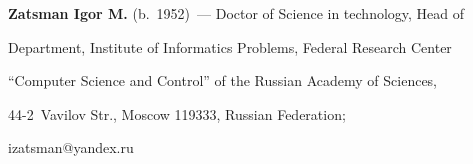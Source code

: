 \noindent


\textbf{Zatsman Igor M.} (b.\ 1952)~--- Doctor of Science in technology, Head of 


Department, Institute of Informatics Problems, Federal Research Center 


``Computer Science and Control'' of the Russian Academy of Sciences,  


44-2~Vavilov Str., Moscow 119333, Russian Federation; 


\mbox{izatsman@yandex.ru}





\label{end\stat}





\renewcommand{\bibname}{\protect\rm Литература}


